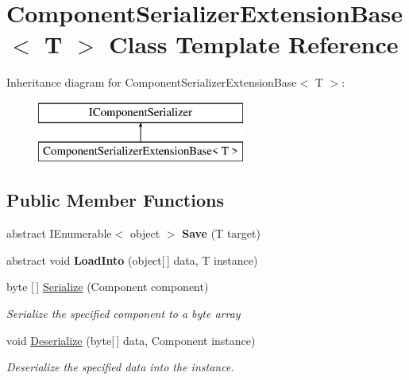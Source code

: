 \hypertarget{class_component_serializer_extension_base}{}\section{Component\+Serializer\+Extension\+Base$<$ T $>$ Class Template Reference}
\label{class_component_serializer_extension_base}
Inheritance diagram for Component\+Serializer\+Extension\+Base$<$ T $>$\+:\begin{figure}[H]
\begin{center}
\leavevmode
\includegraphics[height=2.000000cm]{class_component_serializer_extension_base}
\end{center}
\end{figure}
\subsection*{Public Member Functions}
\begin{DoxyCompactItemize}
\item 
\mbox{\label{class_component_serializer_extension_base_a4814a51da69bbdba5219843f04885551}} 
abstract I\+Enumerable$<$ object $>$ {\bfseries Save} (T target)
\item 
\mbox{\label{class_component_serializer_extension_base_aabcaabbb4ca501f5b3ddb1d7301699cf}} 
abstract void {\bfseries Load\+Into} (object\mbox{[}$\,$\mbox{]} data, T instance)
\item 
byte \mbox{[}$\,$\mbox{]} \hyperlink{class_component_serializer_extension_base_a068c9a1c5f90967de5d22bf9357cfca0}{Serialize} (Component component)
\begin{DoxyCompactList}\small\item\em Serialize the specified component to a byte array \end{DoxyCompactList}\item 
void \hyperlink{class_component_serializer_extension_base_a003b02386876cd68c588aef276124b0c}{Deserialize} (byte\mbox{[}$\,$\mbox{]} data, Component instance)
\begin{DoxyCompactList}\small\item\em Deserialize the specified data into the instance. \end{DoxyCompactList}\end{DoxyCompactItemize}


